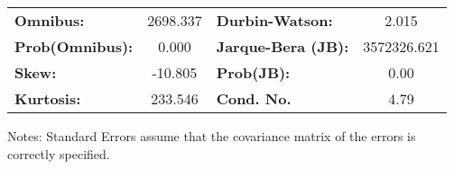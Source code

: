 \begin{center}
\begin{tabular}{lcccccc}
\end{tabular}
\begin{tabular}{lclc}
\textbf{Omnibus:}       & 2698.337 & \textbf{  Durbin-Watson:     } &      2.015   \\
\textbf{Prob(Omnibus):} &   0.000  & \textbf{  Jarque-Bera (JB):  } & 3572326.621  \\
\textbf{Skew:}          & -10.805  & \textbf{  Prob(JB):          } &       0.00   \\
\textbf{Kurtosis:}      & 233.546  & \textbf{  Cond. No.          } &       4.79   \\
\bottomrule
\end{tabular}
\end{center}

Notes: \newline
 [1] Standard Errors assume that the covariance matrix of the errors is correctly specified.